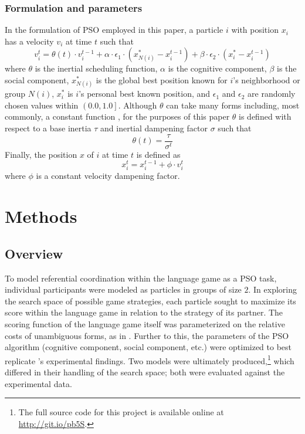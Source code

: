 \documentclass[12pt,a4paper]{article}
\begin{document}
\subsubsection{Formulation and parameters}
\label{sec:2.2.3}
In the formulation of PSO employed in this paper, a particle $i$ with position $x_i$ has a velocity $v_i$ at time $t$ such that
\begin{equation}
v_i^t = \theta(t) \cdot v_i^{t-1} + \alpha \cdot \epsilon_1 \cdot (x_{N(i)}^* - x_i^{t-1}) + \beta \cdot \epsilon_2 \cdot (x_i^* - x_i^{t-1})
\end{equation}
where $\theta$ is the inertial scheduling function, $\alpha$ is the cognitive component, $\beta$ is the social component, $x_{N(i)}^*$ is the global best position known for $i$'s neighborhood or group $N(i)$, $x_i^*$ is $i$'s personal best known position, and $\epsilon_1$ and $\epsilon_2$ are randomly chosen values within $\left(0.0, 1.0\right]$. Although $\theta$ can take many forms including, most commonly, a constant function \citep{yang2014}, for the purposes of this paper $\theta$ is defined with respect to a base inertia $\tau$ and inertial dampening factor $\sigma$ such that
\begin{equation}
\theta(t) = \frac{\tau}{\sigma^t} 
\end{equation}
Finally, the position $x$ of $i$ at time $t$ is defined as
\begin{equation}
x_i^t = x_i^{t-1} + \phi \cdot v_i^t 
\end{equation}
where $\phi$ is a constant velocity dampening factor.

\section{Methods}

\subsection{Overview}

To model referential coordination within the \citeauthor{rohde2012} language game as a PSO task, individual participants were modeled as particles in groups of size $2$. In exploring the search space of possible game strategies, each particle sought to maximize its score within the language game in relation to the strategy of its partner. The scoring function of the language game itself was parameterized on the relative costs of unambiguous forms, as in \citeauthor{rohde2012}. Further to this, the parameters of the PSO algorithm (cognitive component, social component, etc.) were optimized to best replicate \citeauthor{rohde2012}'s experimental findings. Two models were ultimately produced,\footnote{The full source code for this project is available online at \url{http://git.io/pb5S}.} which differed in their handling of the search space; both were evaluated against the experimental data.
\end{document}
